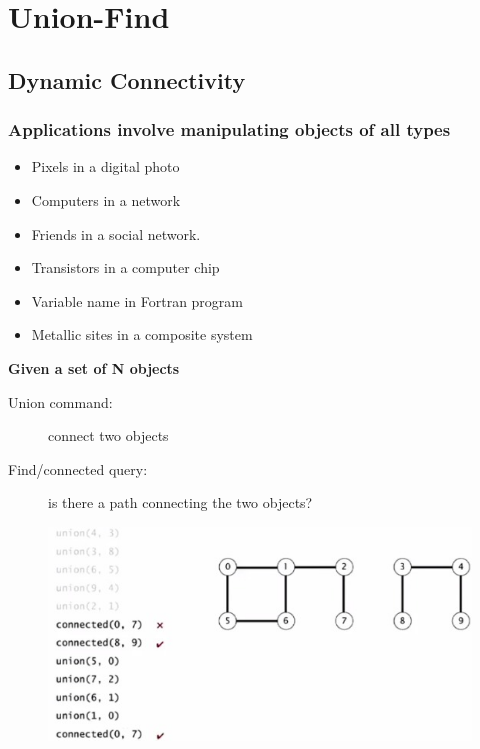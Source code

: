 
\chapter{Union-Find}
\section{Dynamic Connectivity}
\subsection{Applications involve manipulating objects of all types}
\begin{itemize}
 \item Pixels in a digital photo
 \item Computers in a network
 \item Friends in a social network.
 \item Transistors in a computer chip
 \item Variable name in Fortran program
 \item Metallic sites in a composite system
\end{itemize}

\vspace{10 mm}

\textbf{Given a set of N objects}
\begin{description}
  \item[Union command:] connect two objects
  \item[Find/connected query:] is there a path connecting the two objects?
\end{description}

\begin{figure}[h]
   \centering
\includegraphics[scale=0.4]{tex_files/images/dynamicconnectivity.jpg}
\end{figure}



